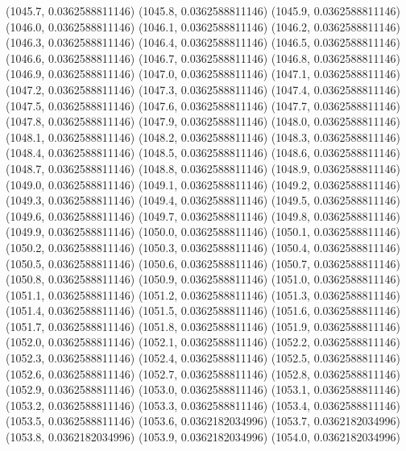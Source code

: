 {					(1045.7, 0.0362588811146)
					(1045.8, 0.0362588811146)
					(1045.9, 0.0362588811146)
					(1046.0, 0.0362588811146)
					(1046.1, 0.0362588811146)
					(1046.2, 0.0362588811146)
					(1046.3, 0.0362588811146)
					(1046.4, 0.0362588811146)
					(1046.5, 0.0362588811146)
					(1046.6, 0.0362588811146)
					(1046.7, 0.0362588811146)
					(1046.8, 0.0362588811146)
					(1046.9, 0.0362588811146)
					(1047.0, 0.0362588811146)
					(1047.1, 0.0362588811146)
					(1047.2, 0.0362588811146)
					(1047.3, 0.0362588811146)
					(1047.4, 0.0362588811146)
					(1047.5, 0.0362588811146)
					(1047.6, 0.0362588811146)
					(1047.7, 0.0362588811146)
					(1047.8, 0.0362588811146)
					(1047.9, 0.0362588811146)
					(1048.0, 0.0362588811146)
					(1048.1, 0.0362588811146)
					(1048.2, 0.0362588811146)
					(1048.3, 0.0362588811146)
					(1048.4, 0.0362588811146)
					(1048.5, 0.0362588811146)
					(1048.6, 0.0362588811146)
					(1048.7, 0.0362588811146)
					(1048.8, 0.0362588811146)
					(1048.9, 0.0362588811146)
					(1049.0, 0.0362588811146)
					(1049.1, 0.0362588811146)
					(1049.2, 0.0362588811146)
					(1049.3, 0.0362588811146)
					(1049.4, 0.0362588811146)
					(1049.5, 0.0362588811146)
					(1049.6, 0.0362588811146)
					(1049.7, 0.0362588811146)
					(1049.8, 0.0362588811146)
					(1049.9, 0.0362588811146)
					(1050.0, 0.0362588811146)
					(1050.1, 0.0362588811146)
					(1050.2, 0.0362588811146)
					(1050.3, 0.0362588811146)
					(1050.4, 0.0362588811146)
					(1050.5, 0.0362588811146)
					(1050.6, 0.0362588811146)
					(1050.7, 0.0362588811146)
					(1050.8, 0.0362588811146)
					(1050.9, 0.0362588811146)
					(1051.0, 0.0362588811146)
					(1051.1, 0.0362588811146)
					(1051.2, 0.0362588811146)
					(1051.3, 0.0362588811146)
					(1051.4, 0.0362588811146)
					(1051.5, 0.0362588811146)
					(1051.6, 0.0362588811146)
					(1051.7, 0.0362588811146)
					(1051.8, 0.0362588811146)
					(1051.9, 0.0362588811146)
					(1052.0, 0.0362588811146)
					(1052.1, 0.0362588811146)
					(1052.2, 0.0362588811146)
					(1052.3, 0.0362588811146)
					(1052.4, 0.0362588811146)
					(1052.5, 0.0362588811146)
					(1052.6, 0.0362588811146)
					(1052.7, 0.0362588811146)
					(1052.8, 0.0362588811146)
					(1052.9, 0.0362588811146)
					(1053.0, 0.0362588811146)
					(1053.1, 0.0362588811146)
					(1053.2, 0.0362588811146)
					(1053.3, 0.0362588811146)
					(1053.4, 0.0362588811146)
					(1053.5, 0.0362588811146)
					(1053.6, 0.0362182034996)
					(1053.7, 0.0362182034996)
					(1053.8, 0.0362182034996)
					(1053.9, 0.0362182034996)
					(1054.0, 0.0362182034996)
}
